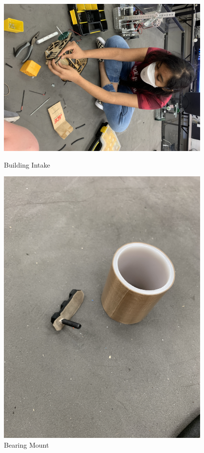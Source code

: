 \begin{figure}[ht]
\centering
\begin{minipage}[b]{.48\textwidth}
  \centering
  \includegraphics[width=0.95\textwidth]{Meetings/August/08-24-21/8-24-21_Hardware_Image3 - Nathan Forrer.JPG}
  \caption{Building Intake}
  \label{fig:082421_5}
\end{minipage}%
\hfill%
\begin{minipage}[b]{.48\textwidth}
  \centering
  \includegraphics[width=0.95\textwidth]{Meetings/August/08-24-21/8-24-21_Hardware_Image4 - Nathan Forrer.JPG}
  \caption{Bearing Mount}
  \label{fig:082421_6}
\end{minipage}
\end{figure}

